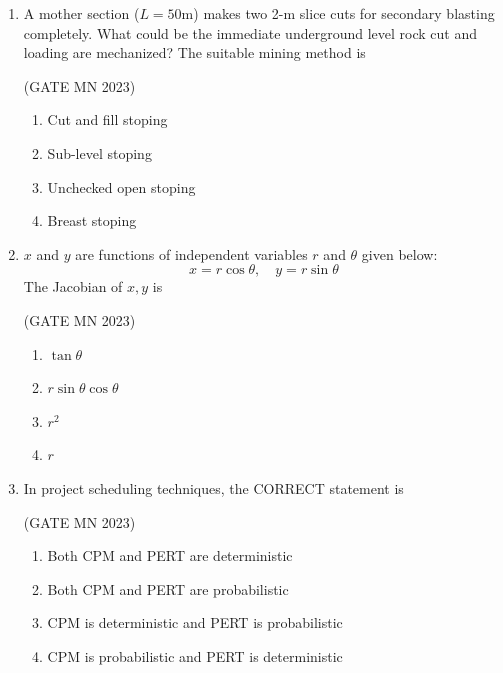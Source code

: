 \documentclass[journal]{IEEEtran}
\begin{document}
\begin{enumerate}
\hfill(GATE MN 2023)
\begin{multicols}{2}
\begin{enumerate}
    \item Unbounded solution  
    \item Infeasible solution  
    \item Multiple optimal solutions  
    \item Unique optimal solution  
\end{enumerate}
\end{multicols}

\item A mother section (\(L=50\)m) makes two 2-m slice cuts for secondary blasting completely. What could be the immediate underground level rock cut and loading are mechanized? The suitable mining method is  


	\hfill(GATE MN 2023)
\begin{multicols}{2}
\begin{enumerate}
    \item Cut and fill stoping  
    \item Sub-level stoping  
    \item Unchecked open stoping  
    \item Breast stoping  
\end{enumerate}
\end{multicols}


\item \(x\) and \(y\) are functions of independent variables \(r\) and \(\theta\) given below:  
\[
x = r \cos \theta, \quad y = r \sin \theta
\]  
The Jacobian of \(x, y\) is  


\hfill(GATE MN 2023)
\begin{multicols}{2}
\begin{enumerate}
    \item \(\tan \theta\)  
    \item \(r \sin \theta \cos \theta\)  
    \item \(r^2\)  
    \item \(r\)  
\end{enumerate}
\end{multicols}


\item In project scheduling techniques, the CORRECT statement is  


	\hfill(GATE MN 2023)
\begin{multicols}{2}
\begin{enumerate}
    \item Both CPM and PERT are deterministic  
    \item Both CPM and PERT are probabilistic  
    \item CPM is deterministic and PERT is probabilistic  
    \item CPM is probabilistic and PERT is deterministic  
\end{enumerate}
\end{multicols}


\end{enumerate}
\end{document}
